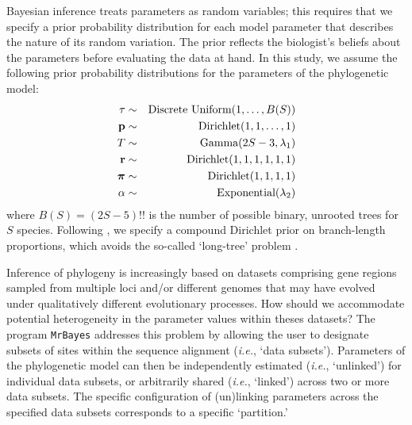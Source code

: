 \documentclass[11pt]{article}
\begin{document}
Bayesian inference treats parameters as random variables; this requires that we specify a prior probability distribution for each model parameter that describes the nature of its random variation.
The prior reflects the biologist's beliefs about the parameters before evaluating the data at hand.
In this study, we assume the following prior probability distributions for the parameters of the phylogenetic model:
\begin{eqnarray*}
\tau & \sim & \mbox{Discrete Uniform}(1, \ldots, B(S)) \\
{\mathbf p} & \sim & \mbox{Dirichlet}(1, 1, \ldots, 1) \\
T & \sim & \mbox{Gamma}(2S-3, \lambda_1) \\
{\mathbf r} & \sim & \mbox{Dirichlet}(1,1,1,1,1,1) \\
\mbox{\boldmath$\pi$\unboldmath} & \sim & \mbox{Dirichlet}(1,1,1,1) \\
\alpha & \sim & \mbox{Exponential}(\lambda_2)
\end{eqnarray*}
where $B(S)=(2S-5)!!$ is the number of possible binary, unrooted trees for $S$ species.
Following \citet[][see also Huelsenbeck and Suchard, 2007]{zhang12}, we specify a compound Dirichlet prior on branch-length proportions, which avoids the so-called `long-tree' problem \citep[{\it sensu} ][]{brown09,rannala12}.

Inference of phylogeny is increasingly based on datasets comprising gene regions sampled from multiple loci and/or different genomes that may have evolved under qualitatively different evolutionary processes. 
How should we accommodate potential heterogeneity in the parameter values within theses datasets?
The program \verb!MrBayes! \citep{ronquist12} addresses this problem by allowing the user to designate subsets of sites within the sequence alignment ({\it i.e.}, `data subsets').
Parameters of the phylogenetic model can then be independently estimated ({\it i.e.}, `unlinked') for individual data subsets, or arbitrarily shared ({\it i.e.}, `linked') across two or more data subsets.
The specific configuration of (un)linking parameters across the specified data subsets corresponds to a specific `partition.'
\end{document}
